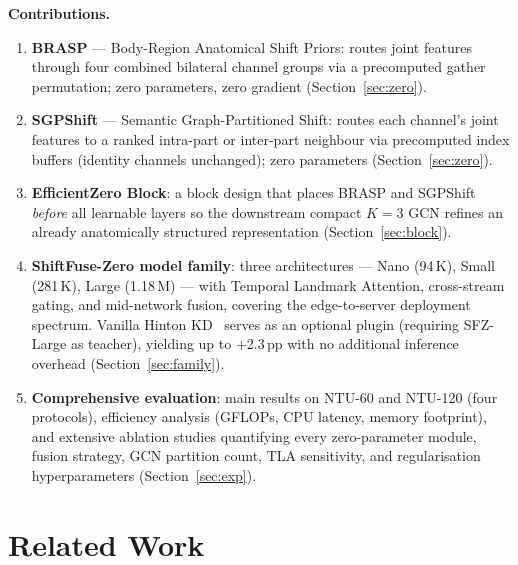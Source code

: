 \documentclass[sigconf,screen,review,anonymous]{acmart}
\begin{document}
\smallskip\noindent\textbf{Contributions.}
\begin{enumerate}[leftmargin=*,topsep=2pt,itemsep=2pt]
\item \textbf{BRASP} --- Body-Region Anatomical Shift Priors: routes
  joint features through four combined bilateral channel groups via a precomputed
  gather permutation; zero parameters, zero gradient
  (Section~\ref{sec:zero}).
\item \textbf{SGPShift} --- Semantic Graph-Partitioned Shift: routes
  each channel's joint features to a ranked intra-part or inter-part neighbour
  via precomputed index buffers (identity channels unchanged); zero parameters
  (Section~\ref{sec:zero}).
\item \textbf{EfficientZero Block}: a block design that places BRASP and
  SGPShift \emph{before} all learnable layers so the downstream compact
  $K{=}3$ GCN refines an already anatomically structured representation
  (Section~\ref{sec:block}).
\item \textbf{ShiftFuse-Zero model family}: three architectures --- Nano
  (94\,K), Small (281\,K), Large (1.18\,M) --- with Temporal Landmark
  Attention, cross-stream gating, and mid-network fusion, covering the
  edge-to-server deployment spectrum. Vanilla Hinton KD~\cite{kd} serves
  as an optional plugin (requiring SFZ-Large as teacher), yielding up to +2.3\,pp with no additional inference overhead
  (Section~\ref{sec:family}).
\item \textbf{Comprehensive evaluation}: main results on NTU-60 and
  NTU-120 (four protocols), efficiency analysis (GFLOPs, CPU latency,
  memory footprint), and extensive ablation studies quantifying every
  zero-parameter module, fusion strategy, GCN partition count, TLA
  sensitivity, and regularisation hyperparameters
  (Section~\ref{sec:exp}).
\end{enumerate}

\section{Related Work}\label{sec:related}
\end{document}

